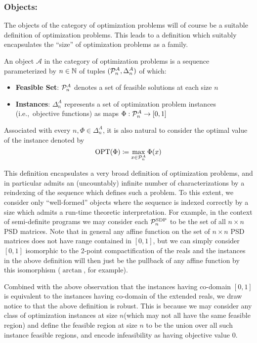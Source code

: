 \documentclass[runningheads,a4paper,english]{llncs}[2022/01/12]
\newcommand{\ie}{i.e.,\ }
\begin{document}
\subsubsection{Objects:}
The objects of the category of optimization problems will of course be a suitable definition of optimization problems.
This leads to a definition which suitably encapsulates the ``size'' of optimization problems as a family.
\begin{definition}\label{def:optprob:obj}
  An object $\mathscr{A}$ in the category of optimization problems is a sequence parameterized by $n \in \mathbb{N}$ of tuples $(\mathcal{P}_n^A, \Delta_n^A)$ of which:
  \begin{itemize}
    \item \textbf{Feasible Set}: $\mathcal{P}_n^A$ denotes a set of feasible solutions at each size $n$
    \item \textbf{Instances}: $\Delta_n^A$ represents a set of optimization problem instances (\ie objective functions) as maps $\Phi: \mathcal{P}_n^A \to [0,1]$
  \end{itemize}
  Associated with every $n, \Phi \in \Delta_n^A$, it is also natural to consider the optimal value of the instance denoted by
  \[\operatorname{OPT}(\Phi) \coloneq \max_{x\in \mathcal{P}_n^A} \Phi(x)\]
\end{definition}
This definition encapsulates a very broad definition of optimization problems, and in particular admits an (uncountably) infinite number of characterizations by a reindexing of the sequence which defines such a problem.
To this extent, we consider only ``well-formed'' objects where the sequence is indexed correctly by a size which admits a run-time theoretic interpretation.
For example, in the context of semi-definite programs we may consider each $\mathcal{P}_n^{\text{SDP}}$ to be the set of all $n\times n$ PSD matrices.
Note that in general any affine function on the set of $n\times n$ PSD matrices does not have range contained in $[0,1]$, but we can simply consider $[0,1]$ isomorphic to the 2-point compactification of the reals and the instances in the above definition will then just be the pullback of any affine function by this isomorphism ($\arctan$, for example).

Combined with the above observation that the instances having co-domain $[0,1]$ is equivalent to the instances having co-domain of the extended reals, we draw notice to that the above definition is robust.
This is because we may consider any class of optimization instances at size $n$(which may not all have the same feasible region) and define the feasible region at size $n$ to be the union over all such instance feasible regions, and encode infeasibility as having objective value $0$.
\end{document}
